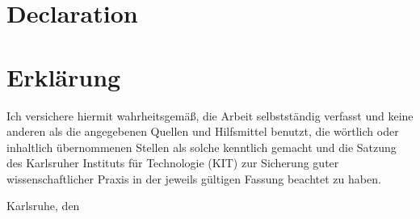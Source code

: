 
{\chapter{Declaration}}
{\chapter{Erklärung}}
\label{ch:Declaration}

Ich versichere hiermit wahrheitsgemäß, die Arbeit selbstständig verfasst und
keine anderen als die angegebenen Quellen und Hilfsmittel benutzt, die wörtlich
oder inhaltlich übernommenen Stellen als solche kenntlich gemacht und die
Satzung des Karlsruher Instituts für Technologie (KIT) zur Sicherung guter
wissenschaftlicher Praxis in der jeweils gültigen Fassung beachtet zu
haben.

\vspace*{1cm}
\hspace*{4cm} Karlsruhe, den \submissiontime \hspace*{0.5cm}\hrulefill \\
\hspace*{10.5cm} \myname \\

